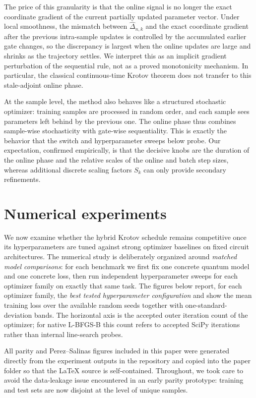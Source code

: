 \documentclass[aps,prb,10pt,twocolumn,superscriptaddress]{revtex4-2}
\begin{document}
The price of this granularity is that the online signal is no longer the exact coordinate gradient of the current partially updated parameter vector. Under local smoothness, the mismatch between \(\widehat{\Delta}_{n,k}\) and the exact coordinate gradient after the previous intra-sample updates is controlled by the accumulated earlier gate changes, so the discrepancy is largest when the online updates are large and shrinks as the trajectory settles. We interpret this as an implicit gradient perturbation of the sequential rule, not as a proved monotonicity mechanism. In particular, the classical continuous-time Krotov theorem does not transfer to this stale-adjoint online phase.

At the sample level, the method also behaves like a structured stochastic optimizer: training samples are processed in random order, and each sample sees parameters left behind by the previous one. The online phase thus combines sample-wise stochasticity with gate-wise sequentiality. This is exactly the behavior that the switch and hyperparameter sweeps below probe. Our expectation, confirmed empirically, is that the decisive knobs are the duration of the online phase and the relative scales of the online and batch step sizes, whereas additional discrete scaling factors \(S_k\) can only provide secondary refinements.

\section{Numerical experiments}

We now examine whether the hybrid Krotov schedule remains competitive once its hyperparameters are tuned against strong optimizer baselines on fixed circuit architectures. The numerical study is deliberately organized around \emph{matched model comparisons}: for each benchmark we first fix one concrete quantum model and one concrete loss, then run independent hyperparameter sweeps for each optimizer family on exactly that same task. The figures below report, for each optimizer family, the \emph{best tested hyperparameter configuration} and show the mean training loss over the available random seeds together with one-standard-deviation bands. The horizontal axis is the accepted outer iteration count of the optimizer; for native L-BFGS-B this count refers to accepted SciPy iterations rather than internal line-search probes.

All parity and Perez--Salinas figures included in this paper were generated directly from the experiment outputs in the repository and copied into the paper folder so that the \LaTeX{} source is self-contained. Throughout, we took care to avoid the data-leakage issue encountered in an early parity prototype: training and test sets are now disjoint at the level of unique samples.
\end{document}
